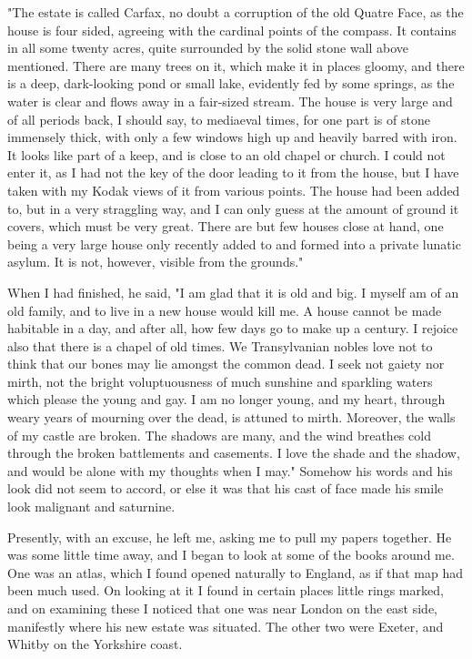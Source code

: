 "The estate is called Carfax, no doubt a corruption of the old Quatre Face, as the house is four sided, agreeing with the cardinal points of the compass. It contains in all some twenty acres, quite surrounded by the solid stone wall above mentioned. There are many trees on it, which make it in places gloomy, and there is a deep, dark-looking pond or small lake, evidently fed by some springs, as the water is clear and flows away in a fair-sized stream. The house is very large and of all periods back, I should say, to mediaeval times, for one part is of stone immensely thick, with only a few windows high up and heavily barred with iron. It looks like part of a keep, and is close to an old chapel or church. I could not enter it, as I had not the key of the door leading to it from the house, but I have taken with my Kodak views of it from various points. The house had been added to, but in a very straggling way, and I can only guess at the amount of ground it covers, which must be very great. There are but few houses close at hand, one being a very large house only recently added to and formed into a private lunatic asylum. It is not, however, visible from the grounds." 

When I had finished, he said, "I am glad that it is old and big. I myself am of an old family, and to live in a new house would kill me. A house cannot be made habitable in a day, and after all, how few days go to make up a century. I rejoice also that there is a chapel of old times. We Transylvanian nobles love not to think that our bones may lie amongst the common dead. I seek not gaiety nor mirth, not the bright voluptuousness of much sunshine and sparkling waters which please the young and gay. I am no longer young, and my heart, through weary years of mourning over the dead, is attuned to mirth. Moreover, the walls of my castle are broken. The shadows are many, and the wind breathes cold through the broken battlements and casements. I love the shade and the shadow, and would be alone with my thoughts when I may." Somehow his words and his look did not seem to accord, or else it was that his cast of face made his smile look malignant and saturnine. 

Presently, with an excuse, he left me, asking me to pull my papers together. He was some little time away, and I began to look at some of the books around me. One was an atlas, which I found opened naturally to England, as if that map had been much used. On looking at it I found in certain places little rings marked, and on examining these I noticed that one was near London on the east side, manifestly where his new estate was situated. The other two were Exeter, and Whitby on the Yorkshire coast. 

